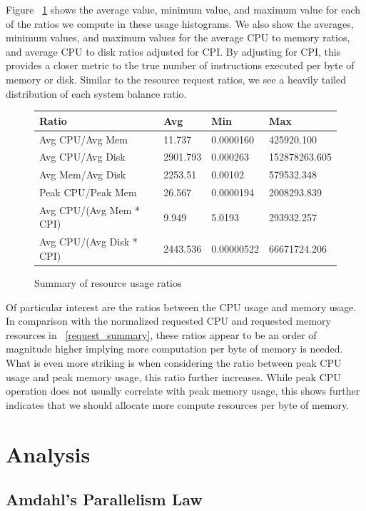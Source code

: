 \documentclass{sig-alternate}
\begin{document}
Figure ~\ref{actual_summary} shows the average value, minimum value, and maximum value for each of the ratios we compute in these usage histograms.
We also show the averages, minimum values, and maximum values for the average CPU to memory ratios, and average CPU to disk ratios adjusted for CPI.
By adjusting for CPI, this provides a closer metric to the true number of instructions executed per byte of memory or disk.
Similar to the resource request ratios, we see a heavily tailed distribution of each system balance ratio.

\begin{figure}
\centering
\begin{tabular}{| p{2.5cm} | p{1.5cm} | p{1.5cm} | p{1.5cm} |} \hline
Ratio & Avg & Min & Max \\ \hline
Avg CPU/Avg Mem & 11.737 & 0.0000160 & 425920.100  \\ \hline
Avg CPU/Avg Disk & 2901.793 & 0.000263 & 152878263.605 \\ \hline
Avg Mem/Avg Disk & 2253.51 & 0.00102 & 579532.348 \\ \hline
Peak CPU/Peak Mem & 26.567 & 0.0000194 & 2008293.839 \\ \hline
Avg CPU/(Avg Mem * CPI) & 9.949 & 5.0193 & 293932.257 \\ \hline
Avg CPU/(Avg Disk * CPI) & 2443.536 & 0.00000522 & 66671724.206 \\ \hline
\end{tabular}
\label{actual_summary}
\caption{Summary of resource usage ratios}
\end{figure}

Of particular interest are the ratios between the CPU usage and memory usage.
In comparison with the normalized requested CPU and requested memory resources in ~\ref{request_summary}, these ratios appear to be an order of magnitude higher implying more computation per byte of memory is needed.
What is even more striking is when considering the ratio between peak CPU usage and peak memory usage, this ratio further increases.
While peak CPU operation does not usually correlate with peak memory usage, this shows further indicates that we should allocate more compute resources per byte of memory.

\section{Analysis}

\subsection{Amdahl's Parallelism Law}
\end{document}
